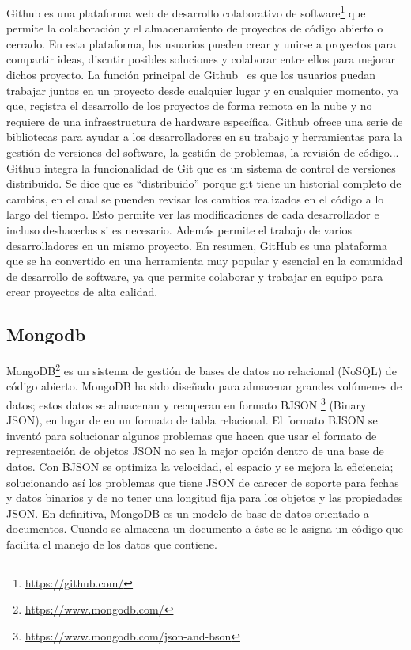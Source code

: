 \documentclass[a4paper, 12pt]{book}
\begin{document}
Github es una plataforma web de desarrollo colaborativo de software\footnote{\url{https://github.com/}} que permite la colaboración y el almacenamiento de proyectos de código abierto o cerrado.
En esta plataforma, los usuarios pueden crear y unirse a proyectos para compartir ideas, discutir posibles soluciones y colaborar entre ellos para mejorar dichos proyecto.
La función principal de Github~\cite{astigarraga2022se} es que los usuarios puedan trabajar juntos en un proyecto desde cualquier lugar y en cualquier momento, ya que, registra el desarrollo de los proyectos de forma remota en la nube y no requiere de una infraestructura de hardware específica.
Github ofrece una serie de bibliotecas para ayudar a los desarrolladores en su trabajo y herramientas para la gestión de versiones del software, la gestión de problemas, la revisión de código... 
Github integra la funcionalidad de Git que es un sistema de control de versiones distribuido.
Se dice que es ``distribuido''  porque git tiene un historial completo de cambios, en el cual se puenden revisar los cambios realizados en el código a lo largo del tiempo. 
Esto permite ver las modificaciones de cada desarrollador e incluso deshacerlas si es necesario. Además permite el trabajo de varios desarrolladores en un mismo proyecto.
En resumen, GitHub es una plataforma que se ha convertido en una herramienta muy popular y esencial en la comunidad de desarrollo de software, ya que permite colaborar y trabajar en equipo para crear proyectos de alta calidad.
 

\subsection{Mongodb} %
\label{sec:mongodb} %

MongoDB\footnote{\url{https://www.mongodb.com/}} es un sistema de gestión de bases de datos no relacional (NoSQL) de código abierto. 
MongoDB ha sido diseñado para almacenar grandes volúmenes de datos; estos datos se almacenan y recuperan en formato BJSON \footnote{\url{https://www.mongodb.com/json-and-bson}} (Binary JSON), en lugar de en un formato de tabla relacional.
El formato BJSON se inventó para solucionar algunos problemas que hacen que usar el formato de representación de objetos JSON no sea la mejor opción dentro de una base de datos. 
Con BJSON se optimiza la velocidad, el espacio y se mejora la eficiencia; solucionando así los problemas que tiene JSON de carecer de soporte para fechas y datos binarios y de no tener una longitud fija para los objetos y las propiedades JSON.
En definitiva, MongoDB es un modelo de base de datos orientado a documentos. Cuando se almacena un documento a éste se le asigna un código que facilita el manejo de los datos que contiene.
\end{document}
